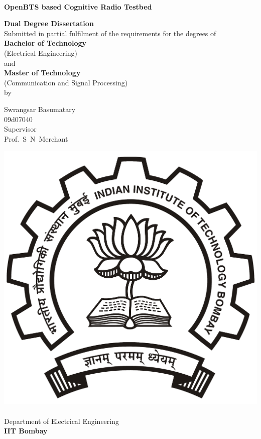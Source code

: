 \begin{titlepage}
\begin{center}
\begin{spacing}{1.0}


~\\[0.3cm]
{ \LARGE \bfseries OpenBTS based Cognitive Radio Testbed\\[1.2cm] }

\textbf{\large Dual Degree Dissertation}\\[1.2cm]

{Submitted in partial fulfilment of the requirements for the degrees 
of\\[0.1cm]
\textbf{Bachelor of Technology} \\[0.1cm]
(Electrical Engineering) \\[0.1cm]
and \\[0.1cm]
\textbf{Master of Technology}\\[0.1cm]
(Communication and Signal Processing) \\[0.3cm]
by\\[0.3cm]}

{\LARGE Swrangsar Basumatary \\[0.1cm]}
{09d07040 \\[1cm]}
{Supervisor \\[0.1cm]}
{\LARGE Prof.~S~N~Merchant \\[1.5cm]}

\includegraphics[width=0.21\textheight]{iitbLogo}~\\[0.9cm]
Department of Electrical Engineering\\[0.2cm]
\textbf{\large IIT Bombay}\\[0.9cm]





\end{spacing}
\end{center}
\end{titlepage}
